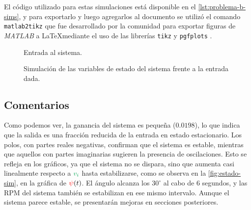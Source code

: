 El código utilizado para estas simulaciones está disponible en el \autoref{lst:problema-b-sims},
y para exportarlo y luego agregarlos al documento se utilizó el comando \texttt{matlab2tikz}
\cite{m2tikz} que fue desarrollado por la comunidad para exportar figuras de \textit{MATLAB} a
\LaTeX mediante el uso de las librerías \texttt{tikz} \cite{pgf} y \texttt{pgfplots}
\cite{pgfplots}.

\begin{figure}[h]
  \centering
  
  \caption{Entrada al sistema.}\label{fig:entrada-sim}
\end{figure}

\begin{figure}[h]
  \centering
  
  \caption{Simulación de las variables de estado del sistema frente a la entrada dada.}\label{fig:estado-sim}
\end{figure}


\subsection{Comentarios}
 

Como podemos ver, la ganancia del sistema es pequeña ($0.0198$), lo que indica que la salida es una fracción reducida de la entrada en estado estacionario. Los polos, con partes reales negativas, confirman que el sistema es estable, mientras que aquellos con partes imaginarias sugieren la presencia de oscilaciones. Esto se refleja en los gráficos, ya que el sistema no se dispara, sino que aumenta casi linealmente respecto a $\verd{v_i}$ hasta estabilizarse, como se observa en la \autoref{fig:estado-sim}, en la gráfica de $\mathbin{\color{red}\psi}(t)$. El ángulo alcanza los $30^\circ$ al cabo de $6$ segundos, y las RPM del sistema también se estabilizan en ese mismo intervalo. Aunque el sistema parece estable, se presentarán mejoras en secciones posteriores.